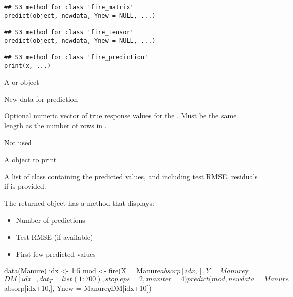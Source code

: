\documentclass[a4paper]{book}
\begin{document}
%
\begin{Usage}
\begin{verbatim}
## S3 method for class 'fire_matrix'
predict(object, newdata, Ynew = NULL, ...)

## S3 method for class 'fire_tensor'
predict(object, newdata, Ynew = NULL, ...)

## S3 method for class 'fire_prediction'
print(x, ...)
\end{verbatim}
\end{Usage}
%
\begin{Arguments}
\begin{ldescription}
\item[\code{object}] A  or  object

\item[\code{newdata}] New data for prediction

\item[\code{Ynew}] Optional numeric vector of true response values for the . Must be the same length as the number of rows in .

\item[\code{...}] Not used

\item[\code{x}] A  object to print
\end{ldescription}
\end{Arguments}
%
\begin{Value}
A list of class  containing the predicted values,
and including test RMSE, residuals if  is provided.

The returned object has a  method that displays:
\begin{itemize}

\item{} Number of predictions
\item{} Test RMSE (if available)
\item{} First few predicted values

\end{itemize}

\end{Value}
%
\begin{SeeAlso}
\end{SeeAlso}
%
\begin{Examples}
\begin{ExampleCode}
data(Manure)
idx <- 1:5
mod <- fire(X = Manure$absorp[idx,], Y = Manure$y$DM[idx],
dat_T = list(1:700), stop.eps = 2, maxiter = 4)
predict(mod, newdata = Manure$absorp[idx+10,],
Ynew = Manure$y$DM[idx+10])

\end{ExampleCode}
\end{Examples}
\end{document}
